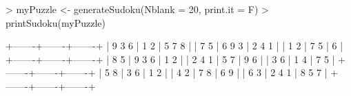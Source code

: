 \begin{Schunk}
\begin{Sinput}
> myPuzzle <- generateSudoku(Nblank = 20, print.it = F)
> printSudoku(myPuzzle)
\end{Sinput}
\begin{Soutput}
  +-------+-------+-------+
  | 9 3 6 |   1 2 | 5 7 8 |
  | 7   5 | 6 9 3 | 2 4 1 |
  | 1 2   | 7   5 | 6     |
  +-------+-------+-------+
  | 8 5   | 9 3 6 |   1 2 |
  | 2 4 1 |   5 7 | 9   6 |
  | 3 6   | 1   4 | 7   5 |
  +-------+-------+-------+
  | 5   8 | 3 6   | 1 2   |
  | 4   2 |   7 8 |   6 9 |
  | 6   3 | 2 4 1 | 8 5 7 |
  +-------+-------+-------+
\end{Soutput}
\end{Schunk}

